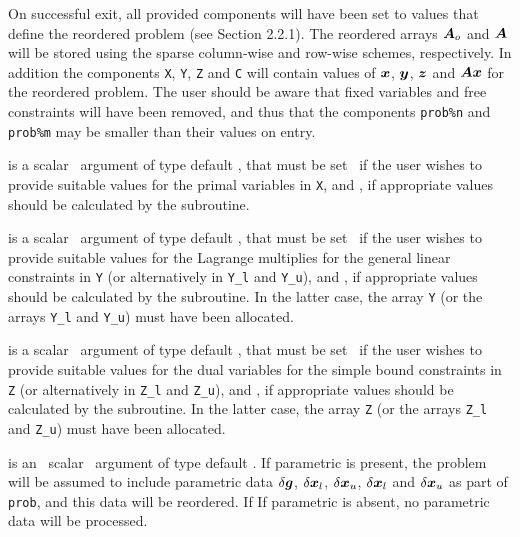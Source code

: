 \documentclass{galahad}
\begin{document}
\begin{description}

On successful exit, all provided components will have been set to values 
that define the reordered problem (see Section 2.2.1). The reordered 
arrays ${\bm{A}}_o$ and ${\bm{A}}$ will be stored using the sparse column-wise and 
row-wise schemes, respectively. In addition the components
{\tt X}, {\tt Y}, {\tt Z} and {\tt C} will contain values of 
${\bm{x}}$, ${\bm{y}}$, ${\bm{z}}$ and ${\bm{A}} {\bm{x}}$ for the reordered problem. 
The user should be aware that fixed variables and free constraints will have 
been removed, and thus that the components {\tt prob\%n} and {\tt prob\%m} 
may be smaller than their values on entry. 

 is a scalar \intentin\ argument of type default \logical, that 
must be set \false\ if the user wishes to provide suitable values for the 
primal variables in {\tt X}, and \true, if appropriate values should be 
calculated by the subroutine. 
 
 is a scalar \intentin\ argument of type default \logical, that 
must be set \false\ if the user wishes to provide suitable values for the 
Lagrange multiplies for the general linear constraints in {\tt Y}
(or alternatively in {\tt Y\_l} and {\tt Y\_u}), 
and \true, if appropriate values should be calculated by the subroutine. 
In the latter case, the array {\tt Y} (or the arrays {\tt Y\_l} and {\tt Y\_u})
must have been allocated.
 
 is a scalar \intentin\ argument of type default \logical, that 
must be set \false\ if the user wishes to provide suitable values for the 
dual variables for the simple bound constraints in {\tt Z}
(or alternatively in {\tt Z\_l} and {\tt Z\_u}), and \true, 
if appropriate values should be calculated by the subroutine. 
In the latter case, the array {\tt Z} (or the arrays {\tt Z\_l} and {\tt Z\_u})
must have been allocated.

is an \optional\ scalar \intentin\ argument of type default \logical. 
If {parametric} is present, the problem will be assumed to include
parametric data $\delta {\bm{g}}$, $\delta {\bm{x}}_l$, $\delta {\bm{x}}_u$, 
$\delta {\bm{x}}_l$ and $\delta {\bm{x}}_u$ as part of {\tt prob},
and this data will be reordered. If 
If {parametric} is absent, no parametric data will be processed.
 
\end{description}
\end{document}
